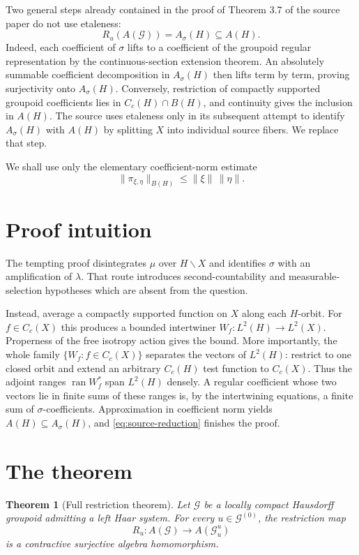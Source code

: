 \documentclass[11pt]{article}
\newtheorem{theorem}{Theorem}
\theoremstyle{remark}
\newcommand{\G}{\mathcal G}
\newcommand{\ran}{\operatorname{ran}}
\begin{document}
Two general steps already contained in the proof of Theorem 3.7 of the source
paper do not use etaleness:
\begin{equation}\label{eq:source-reduction}
       R_u(A(\G))=A_\sigma(H)\subseteq A(H).
\end{equation}
Indeed, each coefficient of $\sigma$ lifts to a coefficient of the groupoid
regular representation by the continuous-section extension theorem.  An
absolutely summable coefficient decomposition in $A_\sigma(H)$ then lifts
term by term, proving surjectivity onto $A_\sigma(H)$.  Conversely, restriction
of compactly supported groupoid coefficients lies in $C_c(H)\cap B(H)$, and
continuity gives the inclusion in $A(H)$.  The source uses etaleness only in
its subsequent attempt to identify $A_\sigma(H)$ with $A(H)$ by splitting
$X$ into individual source fibers.  We replace that step.

We shall use only the elementary coefficient-norm estimate
\[
 \|\pi_{\xi,\eta}\|_{B(H)}\leq \|\xi\|\,\|\eta\|.
\]

\section{Proof intuition}

The tempting proof disintegrates $\mu$ over $H\backslash X$ and identifies
$\sigma$ with an amplification of $\lambda$.  That route introduces
second-countability and measurable-selection hypotheses which are absent from
the question.

Instead, average a compactly supported function on $X$ along each $H$-orbit.
For $f\in C_c(X)$ this produces a bounded intertwiner
$W_f:L^2(H)\to L^2(X)$.  Properness of the free isotropy action gives the
bound.  More importantly, the whole family $\{W_f:f\in C_c(X)\}$ separates
the vectors of $L^2(H)$: restrict to one closed orbit and extend an arbitrary
$C_c(H)$ test function to $C_c(X)$.  Thus the adjoint ranges $\ran W_f^*$
span $L^2(H)$ densely.  A regular coefficient whose two vectors lie in finite
sums of these ranges is, by the intertwining equations, a finite sum of
$\sigma$-coefficients. Approximation in coefficient norm yields
$A(H)\subseteq A_\sigma(H)$, and \eqref{eq:source-reduction} finishes the
proof.

\section{The theorem}

\begin{theorem}[Full restriction theorem]\label{thm:main}
Let $\G$ be a locally compact Hausdorff groupoid admitting a left Haar system.
For every $u\in\G^{(0)}$, the restriction map
\[
           R_u:A(\G)\longrightarrow A(\G_u^u)
\]
is a contractive surjective algebra homomorphism.
\end{theorem}
\end{document}
